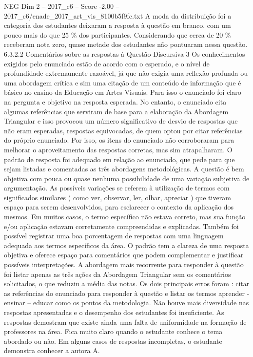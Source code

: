 \begin{textsample}{NEG Dim 2 – 2017\_c6 – Score -2.00 – 2017\_c6/enade\_2017\_art\_vis\_8100b5f9fc.txt}
A moda da distribuição foi a categoria dos estudantes deixaram a resposta à questão em branco, com um pouco mais do que 25 \% dos participantes.
Considerando que cerca de 20 \% receberam nota zero, quase metade dos estudantes não pontuaram nessa questão. 6.3.2.2 Comentários sobre as respostas à Questão Discursiva 3 Os conhecimentos exigidos pelo enunciado estão de acordo com o esperado, e o nível de profundidade extremamente razoável, já que não exigia uma reflexão profunda ou uma abordagem crítica e sim uma citação de um conteúdo de informação que é básico no ensino da Educação em Artes Visuais.
Para isso o enunciado foi claro na pergunta e objetivo na resposta esperada.
No entanto, o enunciado cita algumas referências que serviram de base para a elaboração da Abordagem Triangular e isso provocou um número significativo de desvio de respostas que não eram esperadas, respostas equivocadas, de quem optou por citar referências do próprio enunciado.
Por isso, os itens do enunciado não corroboraram para melhorar o aproveitamento das respostas corretas, mas sim atrapalharam.
O padrão de resposta foi adequado em relação ao enunciado, que pede para que sejam listadas e comentadas as três abordagens metodológicas.
A questão é bem objetiva com pouca ou quase nenhuma possibilidade de uma variação subjetiva de argumentação.
As possíveis variações se referem à utilização de termos com significados similares ( como ver, observar, ler, olhar, apreciar ) que tiveram espaço para serem desenvolvidos, para esclarecer o contexto da aplicação dos mesmos.
Em muitos casos, o termo específico não estava correto, mas sua função e/ou aplicação estavam corretamente compreendidas e explicadas.
Também foi possível registrar uma boa porcentagem de respostas com uma linguagem adequada aos termos específicos da área.
O padrão tem a clareza de uma resposta objetiva e oferece espaço para comentários que podem complementar e justificar possíveis interpretações.
A abordagem mais recorrente para responder à questão foi listar apenas as três ações da Abordagem Triangular sem os comentários solicitados, o que reduziu a média das notas.
Os dois principais erros foram : citar as referências do enunciado para responder à questão e listar os termos aprender - ensinar – educar como os pontos da metodologia.
Não houve mais diversidade nas respostas apresentadas e o desempenho dos estudantes foi insuficiente.
As respostas demostram que existe ainda uma falta de uniformidade na formação de professores na área.
Fica muito claro quando o estudante conhece o tema abordado ou não.
Em alguns casos de respostas incompletas, o estudante demonstra conhecer a autora A.

\end{textsample}
